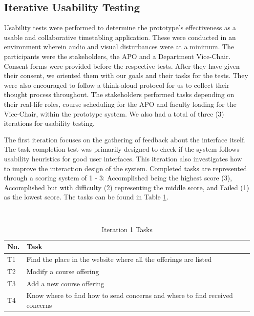 \subsection{Iterative Usability Testing}
Usability tests were performed to determine the prototype's effectiveness as a usable and collaborative timetabling application. These were conducted in an environment wherein audio and visual disturbances were at a minimum. The participants were the stakeholders, the APO and a Department Vice-Chair. Consent forms were provided before the respective tests. After they have given their consent, we oriented them with our goals and their tasks for the tests. They were also encouraged to follow a think-aloud protocol for us to collect their thought process throughout. The stakeholders performed tasks depending on their real-life roles, course scheduling for the APO and faculty loading for the Vice-Chair, within the prototype system. We also had a total of three (3) iterations for usability testing. 

The first iteration focuses on the gathering of feedback about the interface itself. The task completion test was primarily designed to check if the system follows usability heuristics for good user interfaces. This iteration also investigates how to improve the interaction design of the system. Completed tasks are represented through a scoring system of 1 - 3: Accomplished being the highest score (3), Accomplished but with diﬃculty (2) representing the middle score, and Failed (1) as the lowest score. The tasks can be found in Table \ref{tab:tasks1}.

\begin{table}
  \centering
  \caption{Iteration 1 Tasks}~\label{tab:tasks1}
  \addtolength{\tabcolsep}{2pt} 
  \begin{tabular}{p{0.5cm}|p{6.5cm}}
  	\toprule
    \rule{0pt}{8pt}No. & Task \\[2pt]
    \toprule
    T1 & Find the place in the website where all the offerings are listed \\
    T2 & Modify a course offering \\
    T3 & Add a new course offering \\
    T4 & Know where to find how to send concerns and where to find received concerns \\
    \bottomrule
  \end{tabular}
  \addtolength{\tabcolsep}{-2pt} 
\end{table}

